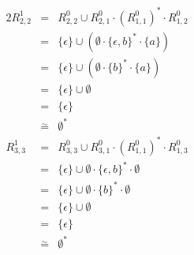 \documentclass[10pt,a4paper,oneside,ngerman,numbers=noenddot]{scrartcl}
\begin{document}
\begin{alignat*}{2}
%
R_{2,2}^{1} &=& R_{2,2}^{0} \cup R_{2,1}^{0} \cdot (R_{1,1}^{0})^{*} \cdot R_{1,2}^{0} \\
&=& \{\epsilon \} \cup (\emptyset \cdot \{\epsilon , b\}^{*} \cdot \{a\}) \\
&=& \{\epsilon \} \cup (\emptyset \cdot \{b\}^{*} \cdot \{a\}) \\
&=& \{\epsilon \} \cup \emptyset \\
&=& \{\epsilon \} \\
&\overset{\sim}{=}& \emptyset^{*} \\
%
R_{3,3}^{1} &=& R_{3,3}^{0} \cup R_{3,1}^{0} \cdot (R_{1,1}^{0})^{*} \cdot R_{1,3}^{0} \\
&=& \{\epsilon \} \cup \emptyset \cdot \{\epsilon , b\}^{*} \cdot \emptyset \\
&=& \{\epsilon \} \cup \emptyset \cdot \{b\}^{*} \cdot \emptyset \\
&=& \{\epsilon \} \cup \emptyset \\
&=& \{\epsilon \} \\
&\overset{\sim}{=}& \emptyset^{*}
\end{alignat*}\\
\end{document}
